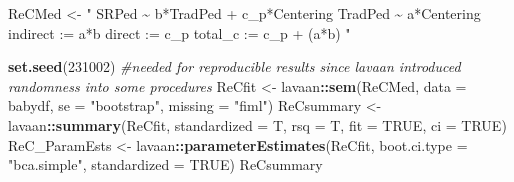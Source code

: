 \documentclass[
  11pt,
]{book}
\newenvironment{Shaded}{\begin{snugshade}}{\end{snugshade}}
\newcommand{\AttributeTok}[1]{\textcolor[rgb]{0.27,0.27,0.27}{#1}}
\newcommand{\CommentTok}[1]{\textcolor[rgb]{0.37,0.37,0.37}{\textit{#1}}}
\newcommand{\ConstantTok}[1]{\textcolor[rgb]{0.37,0.37,0.37}{#1}}
\newcommand{\DecValTok}[1]{\textcolor[rgb]{0.06,0.06,0.06}{#1}}
\newcommand{\FunctionTok}[1]{\textcolor[rgb]{0.27,0.27,0.27}{\textbf{#1}}}
\newcommand{\NormalTok}[1]{#1}
\newcommand{\OtherTok}[1]{\textcolor[rgb]{0.37,0.37,0.37}{#1}}
\newcommand{\SpecialCharTok}[1]{\textcolor[rgb]{0.43,0.43,0.43}{\textbf{#1}}}
\newcommand{\StringTok}[1]{\textcolor[rgb]{0.5,0.5,0.5}{#1}}
\begin{document}
\begin{Shaded}
\begin{Highlighting}[]
\NormalTok{ReCMed }\OtherTok{\textless{}{-}} \StringTok{"}
\StringTok{          SRPed \textasciitilde{} b*TradPed + c\_p*Centering}
\StringTok{          TradPed \textasciitilde{} a*Centering}
\StringTok{          }
\StringTok{          indirect :=  a*b}
\StringTok{          direct  := c\_p}
\StringTok{          total\_c  := c\_p + (a*b)}
\StringTok{          "}

\FunctionTok{set.seed}\NormalTok{(}\DecValTok{231002}\NormalTok{)  }\CommentTok{\#needed for reproducible results since lavaan introduced randomness into some procedures}
\NormalTok{ReCfit }\OtherTok{\textless{}{-}}\NormalTok{ lavaan}\SpecialCharTok{::}\FunctionTok{sem}\NormalTok{(ReCMed, }\AttributeTok{data =}\NormalTok{ babydf, }\AttributeTok{se =} \StringTok{"bootstrap"}\NormalTok{, }\AttributeTok{missing =} \StringTok{"fiml"}\NormalTok{)}
\NormalTok{ReCsummary }\OtherTok{\textless{}{-}}\NormalTok{ lavaan}\SpecialCharTok{::}\FunctionTok{summary}\NormalTok{(ReCfit, }\AttributeTok{standardized =}\NormalTok{ T, }\AttributeTok{rsq =}\NormalTok{ T, }\AttributeTok{fit =} \ConstantTok{TRUE}\NormalTok{,}
    \AttributeTok{ci =} \ConstantTok{TRUE}\NormalTok{)}
\NormalTok{ReC\_ParamEsts }\OtherTok{\textless{}{-}}\NormalTok{ lavaan}\SpecialCharTok{::}\FunctionTok{parameterEstimates}\NormalTok{(ReCfit, }\AttributeTok{boot.ci.type =} \StringTok{"bca.simple"}\NormalTok{,}
    \AttributeTok{standardized =} \ConstantTok{TRUE}\NormalTok{)}
\NormalTok{ReCsummary}
\end{Highlighting}
\end{Shaded}
\end{document}
